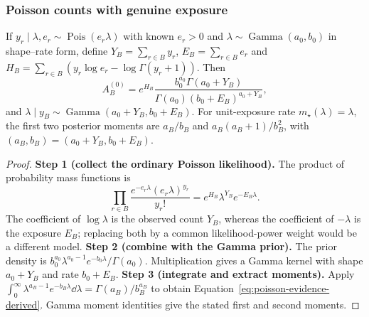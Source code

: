 \subsubsection{Poisson counts with genuine exposure}
\begin{proposition}
\label{prop:poisson-family}
If $y_r\mid\lambda,e_r\sim\operatorname{Pois}(e_r\lambda)$ with known $e_r>0$ and $\lambda\sim\operatorname{Gamma}(a_0,b_0)$ in shape--rate form, define $Y_B=\sum_{r\in B}y_r$, $E_B=\sum_{r\in B}e_r$ and $H_B=\sum_{r\in B}(y_r\log e_r-\log\Gamma(y_r+1))$. Then
\begin{equation}
A^{(0)}_B=e^{H_B}\frac{b_0^{a_0}\Gamma(a_0+Y_B)}{\Gamma(a_0)(b_0+E_B)^{a_0+Y_B}},
\label{eq:poisson-evidence-derived}
\end{equation}
and $\lambda\mid y_B\sim\operatorname{Gamma}(a_0+Y_B,b_0+E_B)$. For unit-exposure rate $m_\star(\lambda)=\lambda$, the first two posterior moments are $a_B/b_B$ and $a_B(a_B+1)/b_B^2$, with $(a_B,b_B)=(a_0+Y_B,b_0+E_B)$.
\end{proposition}
\begin{proof}
\textbf{Step 1 (collect the ordinary Poisson likelihood).}
The product of probability mass functions is
\[
\prod_{r\in B}\frac{e^{-e_r\lambda}(e_r\lambda)^{y_r}}{y_r!}
=e^{H_B}\lambda^{Y_B}e^{-E_B\lambda}.
\]
The coefficient of $\log\lambda$ is the observed count $Y_B$, whereas the coefficient of $-\lambda$ is the exposure $E_B$; replacing both by a common likelihood-power weight would be a different model.
\textbf{Step 2 (combine with the Gamma prior).}
The prior density is $b_0^{a_0}\lambda^{a_0-1}e^{-b_0\lambda}/\Gamma(a_0)$. Multiplication gives a Gamma kernel with shape $a_0+Y_B$ and rate $b_0+E_B$.
\textbf{Step 3 (integrate and extract moments).}
Apply $\int_0^\infty\lambda^{a_B-1}e^{-b_B\lambda}\dd\lambda=\Gamma(a_B)/b_B^{a_B}$ to obtain Equation~\eqref{eq:poisson-evidence-derived}. Gamma moment identities give the stated first and second moments.
\end{proof}

